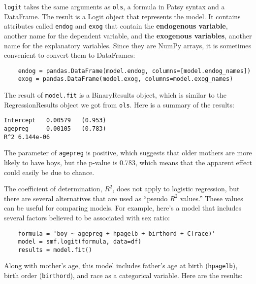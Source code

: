 \documentclass[12pt]{book}
\begin{document}
{\tt logit} takes the same arguments as {\tt ols}, a formula
in Patsy syntax and a DataFrame.  The result is a Logit object
that represents the model.  It contains attributes called
{\tt endog} and {\tt exog} that contain the {\bf endogenous
variable}, another name for the dependent variable,
and the {\bf exogenous variables}, another name for the
explanatory variables.  Since they are NumPy arrays, it is
sometimes convenient to convert them to DataFrames:

\begin{verbatim}
    endog = pandas.DataFrame(model.endog, columns=[model.endog_names])
    exog = pandas.DataFrame(model.exog, columns=model.exog_names)
\end{verbatim}

The result of {\tt model.fit} is a BinaryResults object, which is
similar to the RegressionResults object we got from {\tt ols}.
Here is a summary of the results:

\begin{verbatim}
Intercept   0.00579   (0.953)
agepreg     0.00105   (0.783)
R^2 6.144e-06
\end{verbatim}

The parameter of {\tt agepreg} is positive, which suggests that
older mothers are more likely to have boys, but the p-value is
0.783, which means that the apparent effect could easily be due
to chance.

The coefficient of determination, $R^2$, does not apply to logistic
regression, but there are several alternatives that are used
as ``pseudo $R^2$ values.''  These values can be useful for comparing
models.  For example, here's a model that includes several factors
believed to be associated with sex ratio:

\begin{verbatim}
    formula = 'boy ~ agepreg + hpagelb + birthord + C(race)'
    model = smf.logit(formula, data=df)
    results = model.fit()
\end{verbatim}

Along with mother's age, this model includes father's age at
birth ({\tt hpagelb}), birth order ({\tt birthord}), and
race as a categorical variable.  Here are the results:
\end{document}
